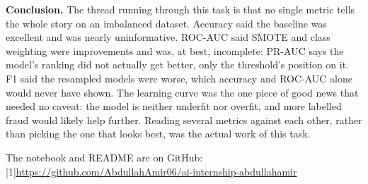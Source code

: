 \documentclass[11pt,a4paper]{article}
\begin{document}
\textbf{Conclusion.} The thread running through this task is that no single metric tells
the whole story on an imbalanced dataset. Accuracy said the baseline was excellent and
was nearly uninformative. ROC-AUC said SMOTE and class weighting were improvements and
was, at best, incomplete: PR-AUC says the model's ranking did not actually get better,
only the threshold's position on it. F1 said the resampled models were worse, which
accuracy and ROC-AUC alone would never have shown. The learning curve was the one
piece of good news that needed no caveat: the model is neither underfit nor overfit, and
more labelled fraud would likely help further. Reading several metrics against each
other, rather than picking the one that looks best, was the actual work of this task.

\vspace{0.4cm}
\noindent The notebook and README are on GitHub: {\small\scalebox{0.82}[1]{\url{https://github.com/AbdullahAmir06/ai-internship-abdullahamir}}}
\end{document}
